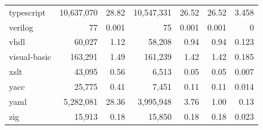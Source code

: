\documentclass[10pt]{article} %
\begin{document}
\begin{table}[t]
{\begin{tabular}{@{\extracolsep{3pt}}lrrrrrr@{}}
typescript               & 10,637,070                                & 28.82                                  & 10,547,331                                             & 26.52                                               & 26.52                      & 3.458                          \\
verilog                  & 77                                        & 0.001                                  & 75                                                     & 0.001                                               & 0.001                      & 0                              \\
vhdl                     & 60,027                                    & 1.12                                   & 58,208                                                 & 0.94                                                & 0.94                       & 0.123                          \\
visual-basic             & 163,291                                   & 1.49                                   & 161,239                                                & 1.42                                                & 1.42                       & 0.185                          \\
xslt                     & 43,095                                    & 0.56                                   & 6,513                                                  & 0.05                                                & 0.05                       & 0.007                          \\
yacc                     & 25,775                                    & 0.41                                   & 7,451                                                  & 0.11                                                & 0.11                       & 0.014                          \\
yaml                     & 5,282,081                                 & 28.36                                  & 3,995,948                                              & 3.76                                                & 1.00                       & 0.13                           \\
zig                      & 15,913                                    & 0.18                                   & 15,850                                                 & 0.18                                                & 0.18                       & 0.023\\                \midrule                                                                  

\end{tabular}}
\end{table}
\end{document}
